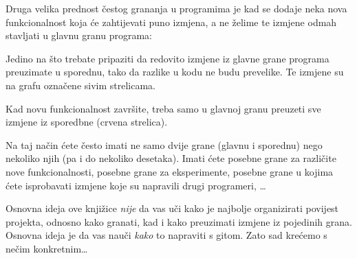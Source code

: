 Druga velika prednost čestog grananja u programima je kad se dodaje neka nova funkcionalnost koja će zahtijevati puno izmjena, a ne želime te izmjene odmah stavljati u glavnu granu programa:



Jedino na što trebate pripaziti da redovito izmjene iz glavne grane programa preuzimate u sporednu, tako da razlike u kodu ne budu prevelike. 
Te izmjene su na grafu označene sivim strelicama.

Kad novu funkcionalnost završite, treba samo u glavnoj granu preuzeti sve izmjene iz sporedbne (crvena strelica).

Na taj način ćete često imati ne samo dvije grane (glavnu i sporednu) nego nekoliko njih (pa i do nekoliko desetaka). 
Imati ćete posebne grane za različite nove funkcionalnosti, posebne grane za eksperimente, posebne grane u kojima ćete isprobavati izmjene koje su napravili drugi programeri, \dots

Osnovna ideja ove knjižice \emph{nije} da vas uči kako je najbolje organizirati povijest projekta, odnosno kako granati, kad i kako preuzimati izmjene iz pojedinih grana. Osnovna ideja je da vas nauči \emph{kako} to napraviti s gitom. Zato sad krećemo s nečim konkretnim\dots

